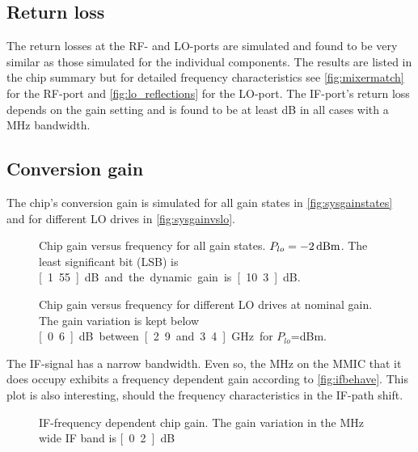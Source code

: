 		\subsection{Return loss}
			The return losses at the RF- and LO-ports are simulated and found to be very similar as those simulated for the individual components. The results are listed in the chip summary but for detailed frequency characteristics see \autoref{fig:mixermatch} for the RF-port and \autoref{fig:lo_reflections} for the LO-port. The IF-port's return loss depends on the gain setting and is found to be at least \unit[21]{dB} in all cases with a \unit[100]{MHz} bandwidth.
			
		\subsection{Conversion gain}
			The chip's conversion gain is simulated for all gain states in \autoref{fig:sysgainstates} and for different LO drives in \autoref{fig:sysgainvslo}.
			
			\begin{figure}[hbt!]
				\centering
				\caption[Chip gain for all gain states.]{Chip gain versus frequency for all gain states. $P_{lo}=\unit[-2]{dBm}$. The least significant bit (LSB) is \unit[1.55]{dB} and the dynamic gain is \unit[10.3]{dB}.}\label{fig:sysgainstates}
			\end{figure}
			
			\begin{figure}[hbt!]
				\centering
				\caption[Chip gain for different LO drives.]{Chip gain versus frequency for different LO drives at nominal gain. The gain variation is kept below \unit[0.6]{dB} between \unit[2.9 and 3.4]{GHz} for $P_{lo}$=\unit[-4 to 0]{dBm}.}\label{fig:sysgainvslo}
			\end{figure}
			
			The IF-signal has a narrow bandwidth. Even so, the \unit[20]{MHz} on the MMIC that it does occupy exhibits a frequency dependent gain according to \autoref{fig:ifbehave}. This plot is also interesting, should the frequency characteristics in the IF-path shift.
			
			\begin{figure}[hbt!]
				\centering
				\caption[IF-frequency dependent chip gain.]{IF-frequency dependent chip gain. The gain variation in the \unit[20]{MHz} wide IF band is \unit[0.2]{dB}}\label{fig:ifbehave}
			\end{figure}
			
